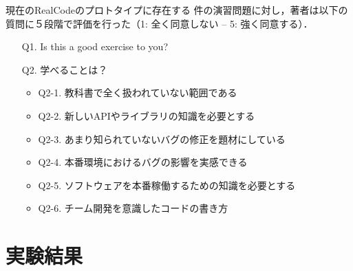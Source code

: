 現在のRealCodeのプロトタイプに存在する \xxx 件の演習問題に対し，著者は以下の質問に５段階で評価を行った（1: 全く同意しない -- 5: 強く同意する）．

\begin{itemize}
  \item[Q1.] Is this a good exercise to you?
  \item[Q2.] 学べることは？
  \begin{itemize}
  	  \item Q2-1. 教科書で全く扱われていない範囲である
   	  \item Q2-2. 新しいAPIやライブラリの知識を必要とする
      \item Q2-3. あまり知られていないバグの修正を題材にしている
      \item Q2-4. 本番環境におけるバグの影響を実感できる
      \item Q2-5. ソフトウェアを本番稼働するための知識を必要とする
      \item Q2-6. チーム開発を意識したコードの書き方
  \end{itemize}
\end{itemize}



\section{実験結果}








